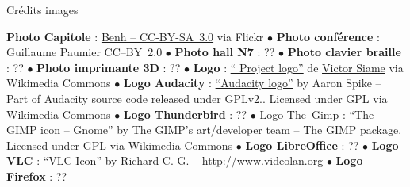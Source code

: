 
\vfill
\begin{center}
\textcolor{Cdl}{Crédits images} \par
{\tiny
\textbf{Photo Capitole} : \href{https://www.flickr.com/photos/blieusong/6986608500/in/set-72157629942158013}{Benh  -- CC-BY-SA~3.0} via Flickr $\bullet$ \textbf{Photo conférence } : Guillaume Paumier CC--BY~2.0 $\bullet$ \textbf{Photo hall N7} : ?? $\bullet$ \textbf{Photo clavier braille} : ?? $\bullet$ \textbf{Photo imprimante 3D} : ?? $\bullet$ \textbf{Logo } : \href{https://commons.wikimedia.org/wiki/File\%3AOfficial_gnu.svg"><img width="512" alt="Official gnu" src="//upload.wikimedia.org/wikipedia/commons/thumb/3/39/Official_gnu.svg/512px-Official_gnu.svg.png}{“ Project logo”} de \href{mailto:vcopovi@wanadoo.fr}{Victor Siame} via Wikimedia Commons $\bullet$ \textbf{Logo Audacity} : \href{https://commons.wikimedia.org/wiki/File:Audacity_Logo.svg#/media/File:Audacity_Logo.svg}{“Audacity logo”} by Aaron Spike -- Part of Audacity source code released under GPLv2.. Licensed under GPL via Wikimedia Commons $\bullet$ \textbf{Logo Thunderbird} : ?? $\bullet$ Logo The~Gimp : \href{https://commons.wikimedia.org/wiki/File:The_GIMP_icon_-_gnome.svg#/media/File:The_GIMP_icon_-_gnome.svg}{“The GIMP icon -- Gnome”} by The GIMP's art/developer team -- The GIMP package. Licensed under GPL via Wikimedia Commons $\bullet$ \textbf{Logo LibreOffice} : ?? $\bullet$ \textbf{Logo VLC} : \href{https://commons.wikimedia.org/wiki/File:VLC_Icon.svg#/media/File:VLC_Icon.svg}{“VLC Icon”} by Richard C. G.  -- \url{http://www.videolan.org} $\bullet$ \textbf{Logo Firefox} : ??


}
\end{center}